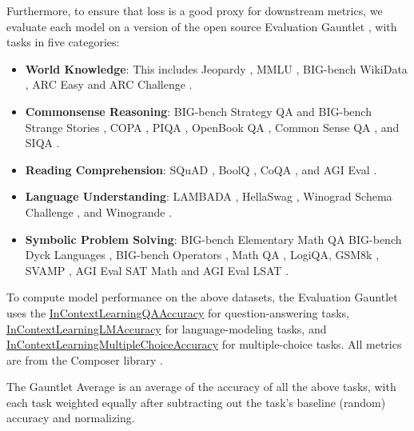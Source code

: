 \documentclass{article}
\theoremstyle{plain}
\theoremstyle{definition}
\theoremstyle{remark}
\begin{document}
Furthermore, to ensure that loss is a good proxy for downstream metrics, we evaluate each model on a version of the open source Evaluation Gauntlet \cite{MosaicML2023LLMEvaluation}, with tasks in five categories:
\begin{itemize}
\item \textbf{World Knowledge}: This includes Jeopardy \cite{jeopardy}, MMLU \cite{hendrycks2020measuring}, BIG-bench WikiData \cite{srivastava2022beyond}, ARC Easy and ARC Challenge \cite{arc}.
\item \textbf{Commonsense Reasoning}:  BIG-bench Strategy QA and BIG-bench Strange Stories  \cite{srivastava2022beyond}, COPA \cite{copa}, PIQA \cite{piqa}, OpenBook QA \cite{openbook_qa}, Common Sense QA \cite{talmor2018commonsenseqa}, and SIQA \cite{sap2019socialiqa}.
\item \textbf{Reading Comprehension}: SQuAD \cite{squad}, BoolQ \cite{clark2019boolq}, CoQA \cite{reddy-etal-2019-coqa}, and AGI Eval \cite{zhong2023agieval}.
\item \textbf{Language Understanding}: LAMBADA \cite{paperno2016lambada}, HellaSwag \cite{zellers2019hellaswag}, Winograd Schema Challenge \cite{winograd}, and Winogrande \cite{winogrande}.
\item \textbf{Symbolic Problem Solving}: BIG-bench Elementary Math QA \cite{srivastava2022beyond} BIG-bench Dyck Languages \cite{srivastava2022beyond}, BIG-bench Operators \cite{srivastava2022beyond}, Math QA \cite{math_qa}, LogiQA, GSM8k \cite{cobbe2021gsm8k}, SVAMP \cite{patel-etal-2021-nlp}, AGI Eval SAT Math and AGI Eval LSAT \cite{zhong2023agieval}.
\end{itemize}
To compute model performance on the above datasets, the Evaluation Gauntlet uses the \href{https://docs.mosaicml.com/projects/composer/en/stable/api_reference/generated/composer.metrics.InContextLearningQAAccuracy.html}{InContextLearningQAAccuracy} for question-answering tasks, \href{https://docs.mosaicml.com/projects/composer/en/stable/api_reference/generated/composer.metrics.InContextLearningLMAccuracy.html}{InContextLearningLMAccuracy} for language-modeling tasks, and \href{https://docs.mosaicml.com/projects/composer/en/stable/api_reference/generated/composer.metrics.InContextLearningMultipleChoiceAccuracy.html}{InContextLearningMultipleChoiceAccuracy} for multiple-choice tasks. All metrics are from the Composer library \cite{composer}.

The Gauntlet Average is an average of the accuracy of all the above tasks, with each task weighted equally after subtracting out the task's baseline (random) accuracy and normalizing.
\end{document}
